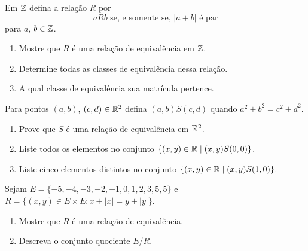 \documentclass[12pt]{exam}
\begin{document}
    \questao{} Em $\mathbb{Z}$ defina a relação $R$ por
    \[
        a R b \mbox{ se, e somente se, } |a + b| \mbox{ é par}
    \]
    para $a$, $b \in \mathbb{Z}$.
    \begin{enumerate}[label={\alph*})]
        \item Mostre que $R$ é uma relação de equivalência em $\mathbb{Z}$.

        \item Determine todas as classes de equivalência dessa relação.

        \item A qual classe de equivalência sua matrícula pertence.
    \end{enumerate}

    \vspace{.3cm}

    \questao{} Para pontos $(a, b)$, $(c, d) \in \mathbb{R}^2$ defina $(a, b) S (c, d)$ quando $a^2 + b^2 = c^2 + d^2$.
    \begin{enumerate}[label={\alph*})]
      \item Prove que $S$ \'e uma rela\c{c}\~ao de equival\^encia em $\mathbb{R}^2$.

      \item Liste todos os elementos no conjunto $\{(x, y) \in \mathbb{R} \mid (x, y) S (0, 0)\}$.

      \item Liste cinco elementos distintos no conjunto $\{(x, y) \in \mathbb{R} \mid (x, y) S (1, 0)\}$.
    \end{enumerate}

    \vspace{.3cm}

    \questao{} Sejam $E = \{-5, -4, -3, -2, -1, 0, 1, 2, 3, 5, 5\}$ e $R = \{(x, y) \in E \times E : x + |x| = y + |y|\}$.
    \begin{enumerate}[label={\alph*})]
        \item Mostre que $R$ \'e uma rela\c{c}\~ao de equival\^encia.

        \item Descreva o conjunto quociente $E/R$.
    \end{enumerate}
    \vspace{.3cm}

\end{document}
